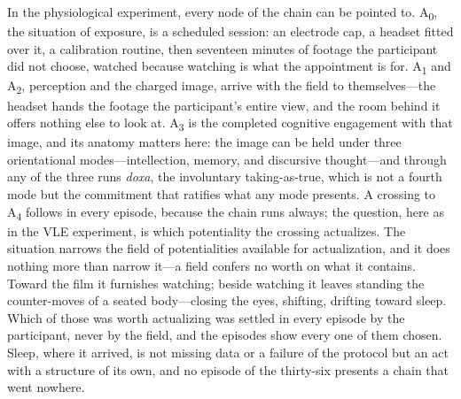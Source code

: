 
In the physiological experiment, every node of the chain can be pointed to. A\textsubscript{0}, the situation
of exposure, is a scheduled session: an electrode cap, a headset fitted over it, a calibration
routine, then seventeen minutes of footage the participant did not choose, watched because
watching is what the appointment is for. A\textsubscript{1} and A\textsubscript{2}, perception
and the charged image, arrive with the field to themselves---the headset hands the footage the
participant's entire view, and the room behind it offers nothing else to look at.
A\textsubscript{3} is the completed cognitive engagement with that image, and its anatomy
matters here: the image can be held under three orientational modes---intellection, memory, and
discursive thought---and through any of the three runs \textit{doxa}, the involuntary
taking-as-true, which is not a fourth mode but the commitment that ratifies what any mode
presents. A crossing to A\textsubscript{4} follows in
every episode, because the chain runs always; the question, here as in the VLE experiment, is which
potentiality the crossing actualizes. The situation narrows the field of potentialities
available for actualization, and it does nothing more than narrow it---a field confers no worth
on what it contains. Toward the film it furnishes watching; beside watching it leaves standing
the counter-moves of a seated body---closing the eyes, shifting, drifting toward sleep. Which
of those was worth actualizing was settled in every episode by the participant, never by the
field, and the episodes show every one of them chosen. Sleep, where it arrived, is not missing
data or a failure of the protocol but an act with a structure of its own, and no episode of the
thirty-six presents a chain that went nowhere.

